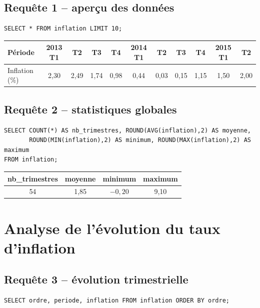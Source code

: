 \documentclass[11pt,a4paper]{article}
\begin{document}
\subsection*{Requête 1 -- aperçu des données}
\begin{lstlisting}
SELECT * FROM inflation LIMIT 10;
\end{lstlisting}

\begin{center}
\small
\begin{tabular}{l*{10}{c}}
\toprule
Période & 2013 T1 & T2 & T3 & T4 & 2014 T1 & T2 & T3 & T4 & 2015 T1 & T2 \\
\midrule
Inflation (\%) & 2,30 & 2,49 & 1,74 & 0,98 & 0,44 & 0,03 & 0,15 & 1,15 & 1,50 & 2,00 \\
\bottomrule
\end{tabular}
\end{center}

\subsection*{Requête 2 -- statistiques globales}
\begin{lstlisting}
SELECT COUNT(*) AS nb_trimestres, ROUND(AVG(inflation),2) AS moyenne,
       ROUND(MIN(inflation),2) AS minimum, ROUND(MAX(inflation),2) AS maximum
FROM inflation;
\end{lstlisting}

\begin{center}
\begin{tabular}{cccc}
\toprule
nb\_trimestres & moyenne & minimum & maximum \\
\midrule
54 & 1,85 & $-0{,}20$ & 9,10 \\
\bottomrule
\end{tabular}
\end{center}

\section{Analyse de l'évolution du taux d'inflation}

\subsection*{Requête 3 -- évolution trimestrielle}
\begin{lstlisting}
SELECT ordre, periode, inflation FROM inflation ORDER BY ordre;
\end{lstlisting}
\end{document}
